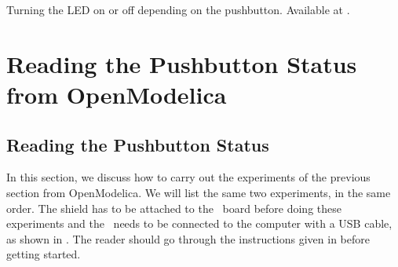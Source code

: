 \begin{juliacode}
\label{julia:push-100}

\end{juliacode}

\begin{juliacode}
  {Turning the LED on or off depending on the pushbutton.  Available at
  .}
\label{julia:push-200}

\end{juliacode}

\section{Reading the Pushbutton Status from OpenModelica}
\subsection{Reading the Pushbutton Status}
In this section, we discuss how to carry out the experiments of the
previous section from OpenModelica.  We will list the same two experiments,
in the same order.  The shield has to be attached to the \arduino\ board
before doing these experiments and the \arduino\ needs to be connected to the computer 
with a USB cable, as shown in .
The reader should go through the instructions given in
 before getting started.

